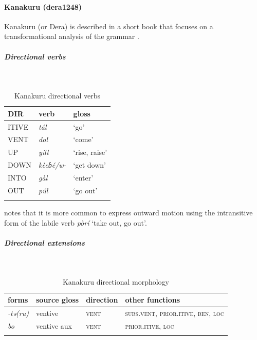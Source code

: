 \paragraph*{Kanakuru (dera1248)} \label{kana}

Kanakuru (or Dera) is described in a short book that focuses on a transformational analysis of the grammar \citep{newmanKanakuruLanguage1974}. 

\subparagraph{Directional verbs}~



\begin{table}[H]
	\caption{Kanakuru directional verbs} 
	\label{tab:kanaV}
	\begin{tabular}{lll} %
		\lsptoprule
		DIR & verb & gloss   \\ %
		\midrule
		ITIVE & \textit{tál} & `go' \\
		VENT & \textit{dol} & `come' \\
		UP & \textit{yíll} & `rise, raise' \\
		DOWN &  \textit{kèeɓé/w-} & `get down' \\
		INTO& \textit{gàl} & `enter' \\
		OUT & \textit{púl} & `go out' \\
		\lspbottomrule
	\end{tabular}
\end{table}

\citet[131]{newmanKanakuruLanguage1974} notes that it is more common to express outward motion using the intransitive form of the labile verb \textit{pòrí} `take out, go out'.

\subparagraph{Directional extensions}~



\begin{table}[H]
	\caption{Kanakuru directional morphology}
	\label{tab:kana}
	\begin{tabular}{llll} %
		\lsptoprule
		forms & source gloss & direction  & other functions  \\ %
		\midrule
		\textit{-tə(ru)}  &  ventive  &   \textsc{vent} &   \textsc{subs.vent}, \textsc{prior.itive}, \textsc{ben}, \textsc{loc} \\
		\textit{bo}  &   ventive aux  &   \textsc{vent} &   \textsc{prior.itive}, \textsc{loc}  \\
		\lspbottomrule
	\end{tabular}
\end{table} 

